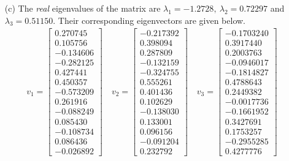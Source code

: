 \documentclass[11pt,a4paper]{article}
\begin{document}
\begin{enumerate}
	\item[(c)] The \emph{real} eigenvalues of the matrix are $\lambda_1=-1.2728, \ \lambda_2=0.72297$ and $\lambda_3=0.51150$. Their corresponding eigenvectors are given below. 
	\pagebreak
		\begin{align*}
		v_1=
		\begin{bmatrix}
			 0.270745 \\ 
			0.105756 \\
			-0.134606 \\
			-0.282125 \\
			0.427441 \\
			0.450357 \\
			-0.573209 \\
			0.261916 \\
			-0.088249 \\
			0.085430 \\
			-0.108734 \\
			0.086436 \\
			-0.026892 
		\end{bmatrix} 
		\quad v_2=
		\begin{bmatrix}
			 -0.217392 \\
			0.398094 \\
			0.287809 \\
			-0.132159 \\ 
			-0.324755 \\
			0.555261 \\
			0.401436 \\
			0.102629 \\
			-0.138030 \\
			0.133001 \\
			0.096156 \\
			-0.091204 \\
			0.232792
		\end{bmatrix}
		\quad v_3=
		\begin{bmatrix}
			 -0.1703240 \\
			0.3917440 \\
			0.2003763 \\
			-0.0946017 \\
			-0.1814827 \\
			0.4788643 \\
			0.2449382 \\
			-0.0017736 \\
			-0.1661952 \\
			0.3427691 \\
			0.1753257 \\
			-0.2955285 \\
			0.4277776
		\end{bmatrix}
	\end{align*}
\end{enumerate}
\end{document}
